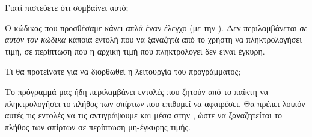 \documentclass[a4paper,11pt,oneside]{book}
\begin{document}
\begin{step}
Γιατί πιστεύετε ότι συμβαίνει αυτό;

\begin{answer}
Ο κώδικας που προσθέσαμε κάνει απλά έναν έλεγχο (με την ). Δεν περιλαμβάνεται \emph{σε αυτόν τον κώδικα} κάποια εντολή που να ξαναζητά από το χρήστη να πληκτρολογήσει τιμή, σε περίπτωση που η αρχική τιμή που πληκτρολογεί δεν είναι έγκυρη. 
\end{answer}

Τι θα προτείνατε για να διορθωθεί η λειτουργία του προγράμματος;

\begin{answer}
Το πρόγραμμά μας ήδη περιλαμβάνει εντολές που ζητούν από το παίκτη να πληκτρολογήσει το πλήθος των σπίρτων που επιθυμεί να αφαιρέσει. Θα πρέπει λοιπόν αυτές τις εντολές να τις αντιγράψουμε και μέσα στην , ώστε να ξαναζητείται το πλήθος των σπίρτων σε περίπτωση μη-έγκυρης τιμής.
\end{answer}
\end{step}
\end{document}
